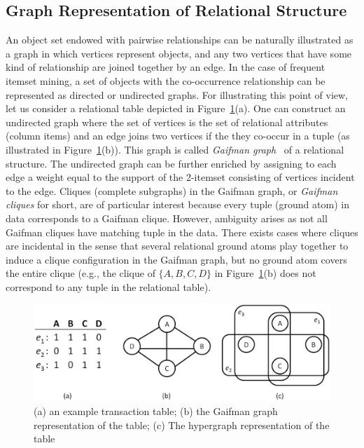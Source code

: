 \subsection{Graph Representation of Relational Structure}
An object set endowed with pairwise relationships can be naturally illustrated as a graph in which vertices represent objects, and any two vertices that have some kind of relationship are joined together by an edge. In the case of frequent itemset mining, a set of objects with the co-occurrence relationship can be represented as directed or undirected graphs. For illustrating this point of view, let us consider a relational table depicted in Figure~\ref{fig:hg_and_rg}(a). One can construct an undirected graph where the set of vertices is the set of relational attributes (column items) and an edge joins two vertices if the they co-occur in a tuple (as illustrated in Figure~\ref{fig:hg_and_rg}(b)). This graph is called \emph{Gaifman graph}~\cite{Hodkinson02finiteconformal} of a relational structure. The undirected graph can be further enriched by assigning to each edge a weight equal to the support of the 2-itemset consisting of vertices incident to the edge. Cliques (complete subgraphs) in the Gaifman graph, or \emph{Gaifman cliques} for short, are of particular interest because every tuple (ground atom) in data corresponds to a Gaifman clique. However, ambiguity arises as not all Gaifman cliques have matching tuple in the data. There exists cases where cliques are incidental in the sense that several relational ground atoms play together to induce a clique configuration in the Gaifman graph, but no ground atom covers the entire clique (e.g., the clique of $\{A,B,C,D\}$ in Figure~\ref{fig:hg_and_rg}(b) does not correspond to any tuple in the relational table).

\begin{figure}[tbh]
\begin{center}
\includegraphics[width=.8\textwidth]{fig/hg_and_rg1.eps}
\end{center}
\caption[An example of simple graph vs. hypergraph for representing a relational table.]{\label{fig:hg_and_rg} (a) an example transaction table; (b) the Gaifman graph representation of the table; (c) The hypergraph representation of the table}
\end{figure}

